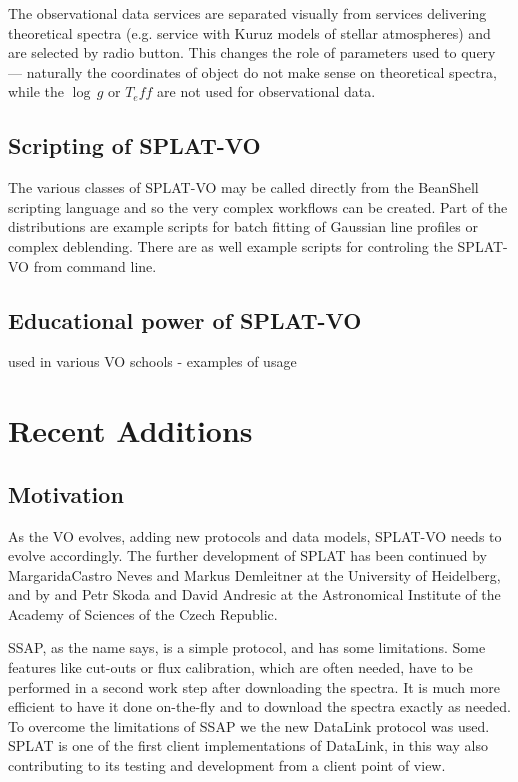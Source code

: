 \documentclass[final,authoryear,5p,times,twocolumn]{elsarticle}
\begin{document}
The observational data services are separated visually from services
delivering theoretical spectra (e.g. service with  Kuruz models of stellar
atmospheres) and are selected by radio button. This changes the role of
parameters used to query --- naturally the coordinates of object do not make
sense on theoretical spectra, while the $\log\,g$ or $T_eff$ are not used for
observational data.


\subsection{Scripting of SPLAT-VO}

The various classes of SPLAT-VO may be called directly from the
BeanShell scripting language \citep{niemeyer2013learning} and so the very complex workflows can be created.
Part of the distributions are example scripts for batch fitting of Gaussian line
profiles or complex deblending. There are as well example scripts for
controling the SPLAT-VO from command line.


\subsection{Educational power of SPLAT-VO}

used in various VO schools - examples of usage




\section{Recent Additions}


\subsection{Motivation}

As the VO evolves, adding new protocols and data models, SPLAT-VO
needs to evolve accordingly.  The further development of SPLAT has
been continued by MargaridaCastro Neves and Markus Demleitner at the
University of Heidelberg, and by and Petr Skoda and David Andresic at
the Astronomical Institute of the Academy of Sciences of the Czech
Republic.

SSAP, as the name says, is a simple protocol, and has some
limitations. Some features like cut-outs or flux calibration, which
are often needed, have to be performed in a second work step after
downloading the spectra. It is much more efficient to have it done
on-the-fly and  to download the spectra exactly as needed. To overcome
the limitations of SSAP we the new DataLink\cite{datalink} protocol
was used. SPLAT is one of the first client implementations of
DataLink, in this way also contributing to its testing and development
from a client point of view.
\end{document}
